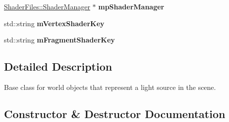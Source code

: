 \begin{DoxyCompactItemize}
\mbox{\hyperlink{class_shader_files_1_1_shader_manager}{Shader\+Files\+::\+Shader\+Manager}} $\ast$ {\bfseries mp\+Shader\+Manager}
\item 
\mbox{\label{class_geometry_engine_1_1_geometry_world_item_1_1_geometry_light_1_1_light_a0ccc9ec1473e73f9fa99ee82f9dd3fde}} 
std\+::string {\bfseries m\+Vertex\+Shader\+Key}
\item 
\mbox{\label{class_geometry_engine_1_1_geometry_world_item_1_1_geometry_light_1_1_light_a89bb65d39f7d64db038f04a543ea3cf5}} 
std\+::string {\bfseries m\+Fragment\+Shader\+Key}
\end{DoxyCompactItemize}


\subsection{Detailed Description}
Base class for world objects that represent a light source in the scene. 

\subsection{Constructor \& Destructor Documentation}
\mbox{\label{class_geometry_engine_1_1_geometry_world_item_1_1_geometry_light_1_1_light_a9dcea4ccc13220212d25379a52dd82b2}} 
